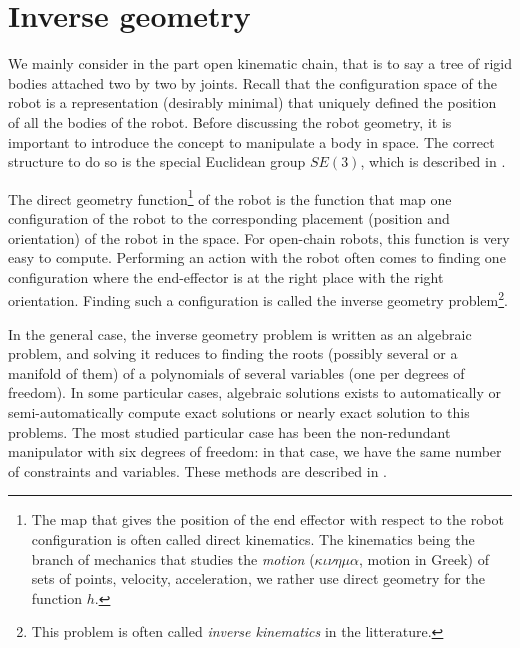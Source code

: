 \documentclass{book}
\begin{document}
\part{Inverse geometry}

We mainly consider in the part open kinematic chain, that is to say a tree of rigid bodies attached two by two by joints. Recall that the configuration space of the robot is a representation (desirably minimal) that uniquely defined the position of all the bodies of the robot. Before discussing the robot geometry, it is important to introduce the concept to manipulate a body in space. The correct structure to do so is the special Euclidean group $SE(3)$, which is described in .

The direct geometry function\footnote{The map that gives the position of the end effector with respect to the robot configuration is often called direct kinematics. The kinematics being the branch of mechanics that studies the \textit{motion} ($\kappa \iota \nu \eta \mu \alpha$, motion in Greek) of sets of points, \mie velocity, acceleration, we rather use direct geometry for the function $h$.} of the robot is the function that map one configuration of the robot to the corresponding placement (position and orientation) of the robot in the space. For open-chain robots, this function is very easy to compute. Performing an action with the robot often comes to finding one configuration where the end-effector is at the right place with the right orientation. Finding such a configuration is called the inverse geometry problem\footnote{This problem is often called \emph{inverse kinematics} in the litterature.}. 

In the general case, the inverse geometry problem is written as an algebraic problem, and solving it reduces to finding the roots (possibly several or a manifold of them) of a polynomials of several variables (one per degrees of freedom). In some particular cases, algebraic solutions exists to automatically or semi-automatically compute exact solutions or nearly exact solution to this problems. The most studied particular case has been the non-redundant manipulator with six degrees of freedom: in that case, we have the same number of constraints and variables. These methods are described in . 
\end{document}
